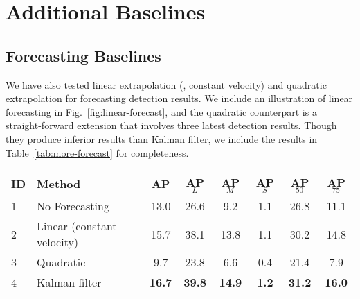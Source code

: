 \section{Additional Baselines}
\label{app:addmethods}

\subsection{Forecasting Baselines}
\label{app:addforecasting}





We have also tested linear extrapolation (\ie, constant velocity) and quadratic extrapolation for forecasting detection results. We include an illustration of linear forecasting in Fig.~\ref{fig:linear-forecast}, and the quadratic counterpart is a straight-forward extension that involves three latest detection results. Though they produce inferior results than Kalman filter, we include the results in Table~\ref{tab:more-forecast} for completeness. 

\begin{table*}[]
\small
\centering
\caption{Comparison of different forecasting methods for streaming perception. We see that both linear and Kalman filter forecasting methods significantly improve the streaming performance. Kalman filter further outperforms the linear forecasting. The quadratic forecasting decreases the AP, suggesting that high-order extrapolation is not suitable for this task. The detection used here is Mask R-CNN ResNet 50 @ s0.5 with dynamic scheduling 
\ifstandalonesupplement
    (Alg. 1)
\else
    (Alg. \ref{alg:1})
\fi
}
\label{tab:more-forecast}
\addtolength{\tabcolsep}{0.22em}
\begin{tabular}{llcccccc}
\toprule
ID & Method                                             & AP            & AP$_L$         & AP$_M$        & AP$_S$        & AP$_{50}$        & AP$_{75}$       \\
\midrule
1 & No Forecasting & 13.0 & 26.6 & 9.2 & 1.1 & 26.8 & 11.1 \\
2 & Linear (constant velocity) & 15.7 & 38.1 & 13.8 & 1.1 & 30.2 & 14.8 \\
3 & Quadratic & 9.7 & 23.8 & 6.6 & 0.4 & 21.4 & 7.9 \\
4 & Kalman filter & \textbf{16.7} & \textbf{39.8} & \textbf{14.9} & \textbf{1.2} & \textbf{31.2} & \textbf{16.0}  \\
\bottomrule
\end{tabular}
\addtolength{\tabcolsep}{-0.2em}
\vspace{-2em}
\end{table*}


